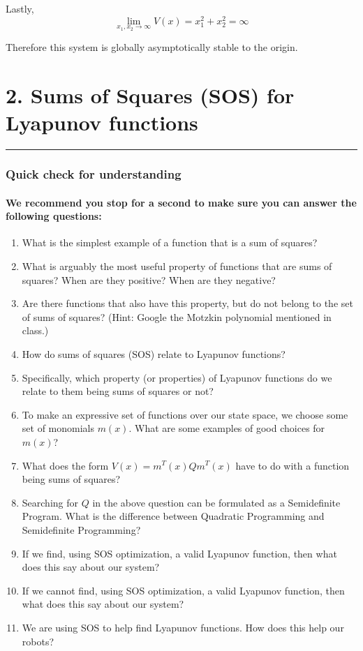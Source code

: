 \documentclass[11pt]{article}
\begin{document}
Lastly, \[\lim_{x_1,x_2\to\infty} V(x) = x_1^2 + x_2^2 = \infty\]

Therefore this system is globally asymptotically stable to the origin.

    \section{2. Sums of Squares (SOS) for Lyapunov
functions}\label{sums-of-squares-sos-for-lyapunov-functions}

    \begin{center}\rule{0.5\linewidth}{\linethickness}\end{center}

\subsubsection{Quick check for
understanding}\label{quick-check-for-understanding}

\paragraph{We recommend you stop for a second to make sure you can
answer the following
questions:}\label{we-recommend-you-stop-for-a-second-to-make-sure-you-can-answer-the-following-questions}

\begin{enumerate}
\def\labelenumi{\arabic{enumi}.}
\item
  What is the simplest example of a function that is a sum of squares?
\item
  What is arguably the most useful property of functions that are sums
  of squares? When are they positive? When are they negative?
\item
  Are there functions that also have this property, but do not belong to
  the set of sums of squares? (Hint: Google the Motzkin polynomial
  mentioned in class.)
\item
  How do sums of squares (SOS) relate to Lyapunov functions?
\item
  Specifically, which property (or properties) of Lyapunov functions do
  we relate to them being sums of squares or not?
\item
  To make an expressive set of functions over our state space, we choose
  some set of monomials \(m(x)\). What are some examples of good choices
  for \(m(x)\)?
\item
  What does the form \(V(x) = m^T(x) Q m^T(x)\) have to do with a
  function being sums of squares?
\item
  Searching for \(Q\) in the above question can be formulated as a
  Semidefinite Program. What is the difference between Quadratic
  Programming and Semidefinite Programming?
\item
  If we find, using SOS optimization, a valid Lyapunov function, then
  what does this say about our system?
\item
  If we cannot find, using SOS optimization, a valid Lyapunov function,
  then what does this say about our system?
\item
  We are using SOS to help find Lyapunov functions. How does this help
  our robots?
\end{enumerate}
\end{document}
